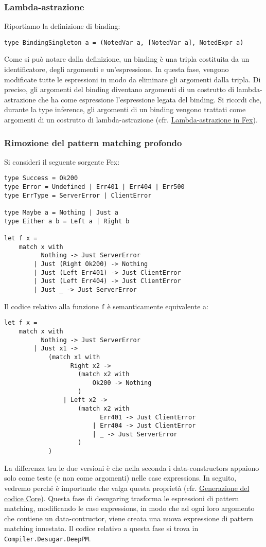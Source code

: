 \documentclass[10pt,a4paper]{article}
\begin{document}
\hypertarget{Lambda-astrazione}{\subsubsection{Lambda-astrazione}}
Riportiamo la definizione di binding:
\begin{lstlisting}
type BindingSingleton a = (NotedVar a, [NotedVar a], NotedExpr a)
\end{lstlisting}
Come si può notare dalla definizione, un binding è una tripla costituita da un identificatore, degli argomenti e
un'espressione. In questa fase, vengono modificate tutte le espressioni in modo da eliminare gli argomenti dalla
tripla. Di preciso, gli argomenti del binding diventano argomenti di un costrutto di lambda-astrazione che ha come
espressione l'espressione legata del binding. Si ricordi che, durante la type inference, gli argomenti di un binding
vengono trattati come argomenti di un costrutto di lambda-astrazione
(cfr. \hyperlink{Lambda-astrazione in Fex}{Lambda-astrazione in Fex}).

\hypertarget{Rimozione del pattern matching profondo}{\subsubsection{Rimozione del pattern matching profondo}}
Si consideri il seguente sorgente Fex:
\begin{lstlisting}
type Success = Ok200
type Error = Undefined | Err401 | Err404 | Err500
type ErrType = ServerError | ClientError

type Maybe a = Nothing | Just a
type Either a b = Left a | Right b

let f x =
    match x with
          Nothing -> Just ServerError
        | Just (Right Ok200) -> Nothing
        | Just (Left Err401) -> Just ClientError
        | Just (Left Err404) -> Just ClientError
        | Just _ -> Just ServerError
\end{lstlisting}
Il codice relativo alla funzione \texttt{f} è semanticamente equivalente a:
\begin{lstlisting}
let f x =
    match x with
          Nothing -> Just ServerError
        | Just x1 ->
            (match x1 with
                  Right x2 ->
                    (match x2 with
                        Ok200 -> Nothing
                    )
                | Left x2 ->
                    (match x2 with
                          Err401 -> Just ClientError
                        | Err404 -> Just ClientError
                        | _ -> Just ServerError
                    )
            )
\end{lstlisting}
La differenza tra le due versioni è che nella seconda i data-constructors appaiono solo come teste (e non come argomenti)
nelle case expressions. In seguito, vedremo perché è importante che valga questa proprietà
(cfr. \hyperlink{Generazione del codice Core}{Generazione del codice Core}). Questa fase di desugaring trasforma le
espressioni di pattern matching, modificando le
case expressions, in modo che ad ogni loro argomento che contiene un data-contructor, viene creata una nuova
expressione di pattern matching innestata. Il codice relativo a questa fase si trova in \texttt{Compiler.Desugar.DeepPM}.
\end{document}
